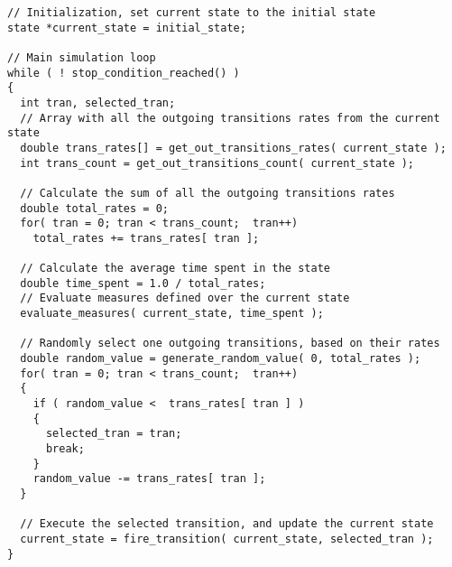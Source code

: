 
\newpage

\begin{lstlisting}[caption={\texttt{Abstract Representation} -  Monte Carlo Algorithm}, label=code:monte_carlo_code, showlines=true]
// Initialization, set current state to the initial state
state *current_state = initial_state;

// Main simulation loop
while ( ! stop_condition_reached() )
{
  int tran, selected_tran;	
  // Array with all the outgoing transitions rates from the current state
  double trans_rates[] = get_out_transitions_rates( current_state );
  int trans_count = get_out_transitions_count( current_state );

  // Calculate the sum of all the outgoing transitions rates
  double total_rates = 0;	
  for( tran = 0; tran < trans_count;  tran++)
    total_rates += trans_rates[ tran ];		

  // Calculate the average time spent in the state
  double time_spent = 1.0 / total_rates;
  // Evaluate measures defined over the current state
  evaluate_measures( current_state, time_spent );

  // Randomly select one outgoing transitions, based on their rates
  double random_value = generate_random_value( 0, total_rates );
  for( tran = 0; tran < trans_count;  tran++)
  {
    if ( random_value <  trans_rates[ tran ] ) 
    {
      selected_tran = tran;
      break;
    }
    random_value -= trans_rates[ tran ];
  }	
		
  // Execute the selected transition, and update the current state
  current_state = fire_transition( current_state, selected_tran );
}

\end{lstlisting}
